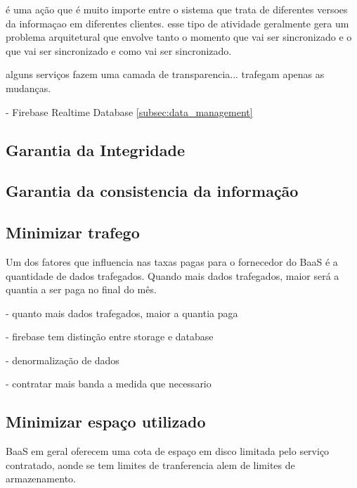	é uma ação que é muito importe entre o sistema que trata de diferentes versoes da informaçao em diferentes clientes. esse tipo de atividade geralmente gera um problema arquitetural que envolve tanto o momento que vai ser sincronizado e o que vai ser sincronizado e como vai ser sincronizado.

	alguns serviços fazem uma camada de transparencia...
	trafegam apenas as mudanças.

	 - Firebase Realtime Database \ref{subsec:data_management}


	\subsection{Garantia da Integridade}%



	\subsection{Garantia da consistencia da informação}%



	\subsection{Minimizar trafego}
	\label{subsec:min_trafic}
	Um dos fatores que influencia nas taxas pagas para o fornecedor do BaaS é a quantidade de dados trafegados. Quando mais dados trafegados, maior será a quantia a ser paga no final do mês.

	- quanto mais dados trafegados, maior a quantia paga

	- firebase tem distinção entre storage e database

	- denormalização de dados

	- contratar mais banda a medida que necessario

	\subsection{Minimizar espaço utilizado}
	\label{subsec:min_space}
	BaaS em geral oferecem uma cota de espaço em disco limitada pelo serviço contratado, aonde se tem limites de tranferencia alem de limites de armazenamento.
	

